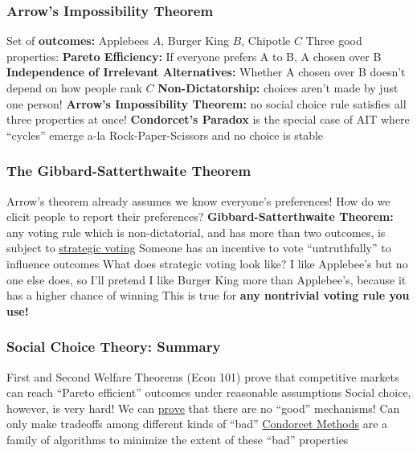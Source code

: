 \documentclass[]{beamer}
\begin{document}
\begin{frame}
\frametitle{Arrow's Impossibility Theorem}

\bi
\m Set of \textbf{outcomes:} Applebees $A$, Burger King $B$, Chipotle $C$ \pause
\m Three good properties:
\be
\m \textbf{Pareto Efficiency:} If everyone prefers A to B, A chosen over B
\m \textbf{Independence of Irrelevant Alternatives:} Whether A chosen over B doesn't depend on how people rank $C$
\m \textbf{Non-Dictatorship:} choices aren't made by just one person!
\ee \pause
\m \textbf{Arrow's Impossibility Theorem:} no social choice rule satisfies all three properties at once! \pause
\m \textbf{Condorcet's Paradox} is the special case of AIT where ``cycles'' emerge a-la Rock-Paper-Scissors and no choice is stable 
\ei

\end{frame}

\begin{frame}
\frametitle{The Gibbard-Satterthwaite Theorem}

\bi
\m Arrow's theorem already assumes we know everyone's preferences! How do we elicit people to report their preferences? \pause
\m \textbf{Gibbard-Satterthwaite Theorem:} any voting rule which is non-dictatorial, and has more than two outcomes, is subject to \ul{strategic voting}
\bi
\m Someone has an incentive to vote ``untruthfully'' to influence outcomes
\ei \pause
\m What does strategic voting look like?
\bi
\m I like Applebee's but no one else does, so I'll pretend I like Burger King more than Applebee's, because it has a higher chance of winning
\ei \pause
\m This is true for \textbf{any nontrivial voting rule you use!}
\ei

\end{frame}


\begin{frame}
\frametitle{Social Choice Theory: Summary}

\bi
\m First and Second Welfare Theorems (Econ 101) prove that competitive markets can reach ``Pareto efficient'' outcomes under reasonable assumptions 
\pause
\m Social choice, however, is very hard! 
\bi
\m We can \ul{prove} that there are no ``good'' mechanisms!
\m Can only make tradeoffs among different kinds of ``bad'' 
\m \href{https://www.equal.vote/minimax}{Condorcet Methods} are a family of algorithms to minimize the extent of these ``bad'' properties 
\ei
\ei

\end{frame}
\end{document}

